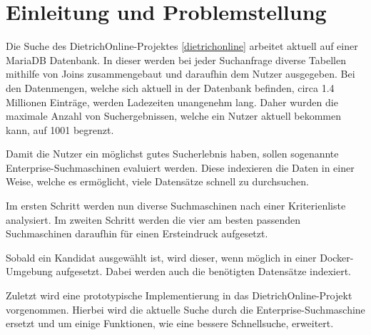 \chapter{Einleitung und Problemstellung}


Die Suche des DietrichOnline-Projektes \ref{dietrichonline} arbeitet aktuell auf einer MariaDB Datenbank. In dieser werden bei jeder Suchanfrage diverse Tabellen mithilfe von Joins zusammengebaut und daraufhin dem Nutzer ausgegeben. Bei den Datenmengen, welche sich aktuell in der Datenbank befinden, circa 1.4 Millionen Einträge, werden Ladezeiten unangenehm lang. Daher wurden die maximale Anzahl von Suchergebnissen, welche ein Nutzer aktuell bekommen kann, auf 1001 begrenzt. 

Damit die Nutzer ein möglichst gutes Sucherlebnis haben, sollen sogenannte Enterprise-Suchmaschinen evaluiert werden. Diese indexieren die Daten in einer Weise, welche es ermöglicht, viele Datensätze schnell zu durchsuchen. 

Im ersten Schritt werden nun diverse Suchmaschinen nach einer Kriterienliste analysiert. Im zweiten Schritt werden die vier am besten passenden Suchmaschinen daraufhin für einen Ersteindruck aufgesetzt.

Sobald ein Kandidat ausgewählt ist, wird dieser, wenn möglich in einer Docker-Umgebung aufgesetzt. Dabei werden auch die benötigten Datensätze indexiert.

Zuletzt wird eine prototypische Implementierung in das DietrichOnline-Projekt vorgenommen. Hierbei wird die aktuelle Suche durch die Enterprise-Suchmaschine ersetzt und um einige Funktionen, wie eine bessere Schnellsuche, erweitert. 